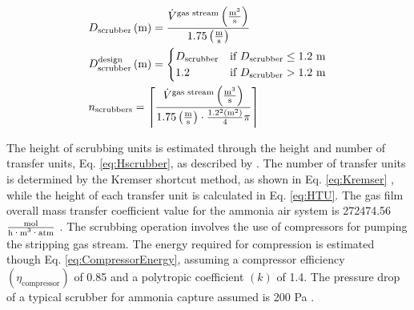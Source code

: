 \begin{refsection}[referencesApD]
\begin{align}	
& D_{\text{scrubber}} \left(\text{m}\right) = \frac{\dot{V}^{\text{gas stream}} \left(\frac{\text{m}^3}{\text{s}}\right)}{1.75 \left(\frac{\text{m}}{\text{s}}\right)} \label{eq:scrubberD}
\\
& D_{\text{scrubber}}^{\text{design}} \left(\text{m}\right) =
\begin{cases}
D_{\text{scrubber}} & \text{if } 	D_{\text{scrubber}} \leq 1.2 \text{ m}  
\\
1.2 & \text{if }  D_{\text{scrubber}} > 1.2 \text{ m}
\end{cases} \label{eq:scrubberDdesign} \\
& n_{\text{scrubbers}} = \ceil*{\frac{\dot{V}^{\text{gas stream}} \left(\frac{\text{m}^3}{\text{s}}\right)}{1.75 \left(\frac{\text{m}}{\text{s}}\right) \cdot \frac{1.2^2 \left(\text{m}^2\right)}{4} \pi }}\label{eq:nscrubbers}
\end{align}	

The height of scrubbing units is estimated through the height and number of transfer units, Eq. \ref{eq:Hscrubber}, as described by \citet{couper2005chem}. The number of transfer units is determined by the Kremser shortcut method, as shown in Eq. \ref{eq:Kremser} \citep{seader2004prod}, while the height of each transfer unit is calculated in Eq. \ref{eq:HTU}. The gas film overall mass transfer coefficient value for the ammonia air system is 272474.56 $\frac{\text{mol}}{\text{h·m\textsuperscript{3}·atm}}$ \citep{Branan2005}. 
The scrubbing operation involves the use of compressors for pumping the stripping gas stream. The energy required for compression is estimated though Eq. \ref{eq:CompressorEnergy}, assuming a compressor efficiency $\left(\eta_{\text{compressor}}\right)$ of 0.85 and a polytropic coefficient $\left(k\right)$ of 1.4. The pressure drop of a typical scrubber for ammonia capture assumed is 200 Pa \citep{melse2005air}.


\end{refsection}
